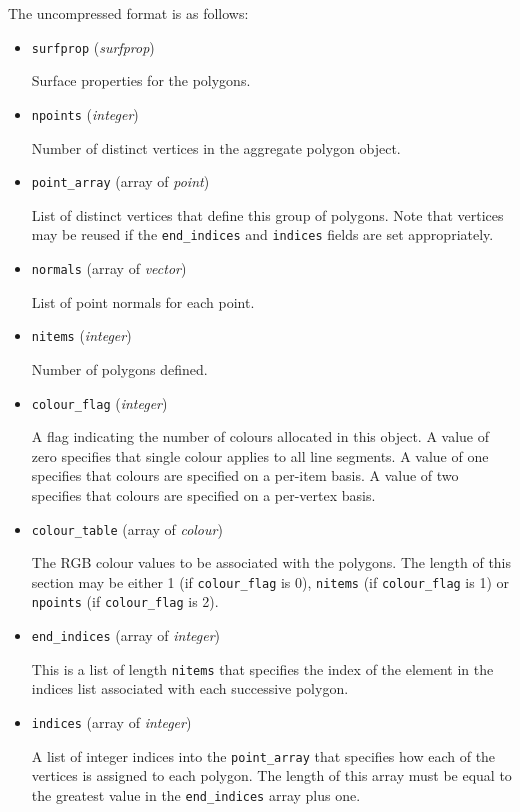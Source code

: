 \documentclass{article}
\newcommand{\kw}[1]{{\tt \mbox{#1}}}
\begin{document}
The uncompressed format is as follows:

\begin{itemize}
\item \kw{surfprop} ({\it surfprop})

Surface properties for the polygons.

\item \kw{npoints} ({\it integer})

Number of distinct vertices in the aggregate polygon object.

\item \kw{point\_array} (array of {\it point})

List of distinct vertices that define this group of polygons.  Note that
vertices may be reused if the \kw{end\_indices} and \kw{indices}
fields are set appropriately.

\item \kw{normals} (array of {\it vector})

List of point normals for each point.

\item \kw{nitems} ({\it integer})

Number of polygons defined.

\item \kw{colour\_flag} ({\it integer})

A flag indicating the number of colours allocated in this object.  A
value of zero specifies that single colour applies to all line segments.
A value of one specifies that colours are specified on a per-item basis.
A value of two specifies that colours are specified on a per-vertex
basis.

\item \kw{colour\_table} (array of {\it colour})

The RGB colour values to be associated with the polygons.  The length of
this section may be either 1 (if \kw{colour\_flag} is 0), \kw{nitems}
(if \kw{colour\_flag} is 1) or \kw{npoints} (if \kw{colour\_flag} is
2).

\item \kw{end\_indices} (array of {\it integer})

This is a list of length \kw{nitems} that specifies the index of the
element in the indices list associated with each successive polygon.

\item \kw{indices} (array of {\it integer})

A list of integer indices into the \kw{point\_array} that specifies how
each of the vertices is assigned to each polygon.  The length of this
array must be equal to the greatest value in the \kw{end\_indices}
array plus one.

\end{itemize}
\end{document}
